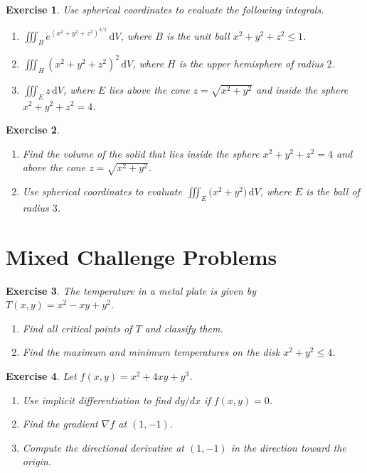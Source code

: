 \documentclass[12pt,a4paper]{article}
\theoremstyle{exercise}
\newtheorem{exercise}{Exercise}[section]
\theoremstyle{hint}
\newcommand{\dd}{\,\mathrm{d}}
\newcommand{\grad}{\nabla}
\begin{document}
\begin{exercise}
Use spherical coordinates to evaluate the following integrals.
\begin{enumerate}[label=(\alph*)]
  \item $\displaystyle\iiint_{B}e^{(x^{2}+y^{2}+z^{2})^{3/2}}\dd V$,
        where $B$ is the unit ball $x^{2}+y^{2}+z^{2}\leq 1$.
  \item $\displaystyle\iiint_{H}(x^{2}+y^{2}+z^{2})^{2}\dd V$, where
        $H$ is the upper hemisphere of radius $2$.
  \item $\displaystyle\iiint_{E}z\dd V$, where $E$ lies above the cone
        $z=\sqrt{x^{2}+y^{2}}$ and inside the sphere $x^{2}+y^{2}+z^{2}=4$.
\end{enumerate}
\end{exercise}

\begin{exercise}
\begin{enumerate}[label=(\alph*)]
  \item Find the volume of the solid that lies inside the sphere
        $x^{2}+y^{2}+z^{2}=4$ and above the cone $z=\sqrt{x^{2}+y^{2}}$.
  \item Use spherical coordinates to evaluate
        $\displaystyle\iiint_{E}\bigl(x^{2}+y^{2}\bigr)\dd V$, where $E$
        is the ball of radius $3$.
\end{enumerate}
\end{exercise}

\section{Mixed Challenge Problems}

\begin{exercise}
The temperature in a metal plate is given by
$T(x,y)=x^{2}-xy+y^{2}$.
\begin{enumerate}[label=(\alph*)]
  \item Find all critical points of $T$ and classify them.
  \item Find the maximum and minimum temperatures on the disk
        $x^{2}+y^{2}\leq 4$.
\end{enumerate}
\end{exercise}

\begin{exercise}
Let $f(x,y)=x^{2}+4xy+y^{3}$.
\begin{enumerate}[label=(\alph*)]
  \item Use implicit differentiation to find $dy/dx$ if
        $f(x,y)=0$.
  \item Find the gradient $\grad f$ at $(1,-1)$.
  \item Compute the directional derivative at $(1,-1)$ in the direction
        toward the origin.
\end{enumerate}
\end{exercise}
\end{document}
